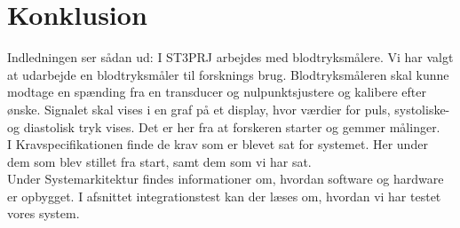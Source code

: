 \chapter{Konklusion}
Indledningen ser sådan ud: 
I ST3PRJ arbejdes med blodtryksmålere. Vi har valgt at udarbejde en blodtryksmåler til forsknings brug. Blodtryksmåleren skal kunne modtage en spænding fra en transducer  og nulpunktsjustere og kalibere efter ønske. Signalet skal vises i en graf på et display, hvor værdier for puls, systoliske- og diastolisk tryk vises. Det er her fra at forskeren starter og gemmer målinger.\\
I Kravspecifikationen finde de krav som er blevet sat for systemet. Her under dem som blev stillet fra start, samt dem som vi har sat.\\
Under Systemarkitektur findes informationer om, hvordan software og hardware er opbygget.  I afsnittet integrationstest kan der læses om, hvordan vi har testet vores system.\\  

